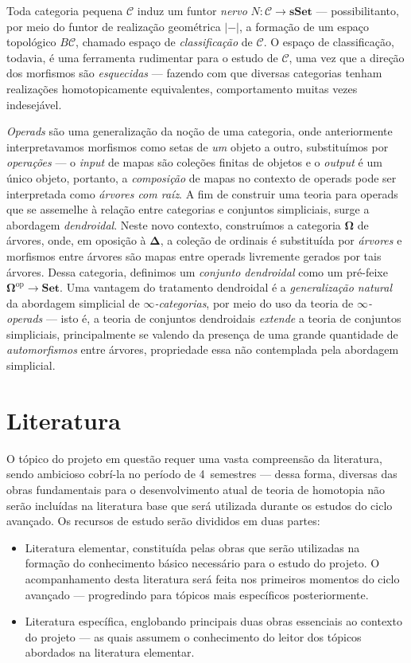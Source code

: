 \documentclass[11pt,reqno]{amsart}
\theoremstyle{definition}
\newcommand{\op}{\mathrm{op}}
\newcommand{\cat}{\mathcal}
\newcommand{\Set}{{\textbf{Set}}}
\newcommand{\sSet}{{\textbf{sSet}}}
\newcommand{\Trees}{{\mathbf{\Omega}}}
\begin{document}
Toda categoria pequena \(\cat C\) induz um funtor \emph{nervo} \(N: \cat C \to
\sSet\) --- possibilitanto, por meio do funtor de realização geométrica \(|-|\),
a formação de um espaço topológico \(B\cat{C}\), chamado espaço de
\emph{classificação} de \(\cat C\). O espaço de classificação, todavia, é uma
ferramenta rudimentar para o estudo de \(\cat C\), uma vez que a direção dos
morfismos são \emph{esquecidas} --- fazendo com que diversas categorias tenham
realizações homotopicamente equivalentes, comportamento muitas vezes indesejável.

\emph{Operads} são uma generalização da noção de uma categoria, onde
anteriormente interpretavamos morfismos como setas de \emph{um} objeto a outro,
substituímos por \emph{operações} --- o \textit{input} de mapas são coleções
finitas de objetos e o \textit{output} é um único objeto, portanto, a
\emph{composição} de mapas no contexto de operads pode ser interpretada como
\emph{árvores com raíz}. A fim de construir uma teoria para operads que se
assemelhe à relação entre categorias e conjuntos simpliciais, surge a abordagem
\emph{dendroidal}. Neste novo contexto, construímos a categoria \(\Trees\) de
árvores, onde, em oposição à \(\mathbf{\Delta}\), a coleção de ordinais é
substituída por \emph{árvores} e morfismos entre árvores são mapas entre operads
livremente gerados por tais árvores. Dessa categoria, definimos um
\emph{conjunto dendroidal} como um pré-feixe \(\Trees^{\op} \to \Set\). Uma
vantagem do tratamento dendroidal é a \emph{generalização natural} da abordagem
simplicial de \emph{\(\infty\)-categorias}, por meio do uso da teoria de
\emph{\(\infty\)-operads} --- isto é, a teoria de conjuntos dendroidais
\emph{extende} a teoria de conjuntos simpliciais, principalmente se valendo da
presença de uma grande quantidade de \emph{automorfismos} entre árvores,
propriedade essa não contemplada pela abordagem simplicial.

\section{Literatura}

O tópico do projeto em questão requer uma vasta compreensão da literatura, sendo
ambicioso cobrí-la no período de 4~semestres --- dessa forma, diversas das obras
fundamentais para o desenvolvimento atual de teoria de homotopia não serão
incluídas na literatura base que será utilizada durante os estudos do ciclo
avançado. Os recursos de estudo serão divididos em duas partes:
\begin{itemize}\setlength\itemsep{0em}
\item Literatura elementar, constituída pelas obras que serão utilizadas na
  formação do conhecimento básico necessário para o estudo do projeto. O
  acompanhamento desta literatura será feita nos primeiros momentos do ciclo
  avançado --- progredindo para tópicos mais específicos posteriormente.

\item Literatura específica, englobando principais duas obras essenciais ao
  contexto do projeto --- as quais assumem o conhecimento do leitor dos tópicos
  abordados na literatura elementar.
\end{itemize}
\end{document}

